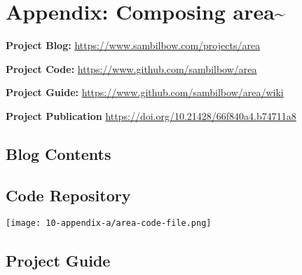\chapter{Appendix: Composing area\textasciitilde{}}

\noindent \textbf{Project Blog:}        \url{https://www.sambilbow.com/projects/area}

\noindent \textbf{Project Code:}        \url{https://www.github.com/sambilbow/area}

\noindent \textbf{Project Guide:}       \url{https://www.github.com/sambilbow/area/wiki}

\noindent \textbf{Project Publication } \url{https://doi.org/10.21428/66f840a4.b74711a8}

\section{Blog Contents}
\section{Code Repository}
\texttt{[image: 10-appendix-a/area-code-file.png]}
\section{Project Guide}